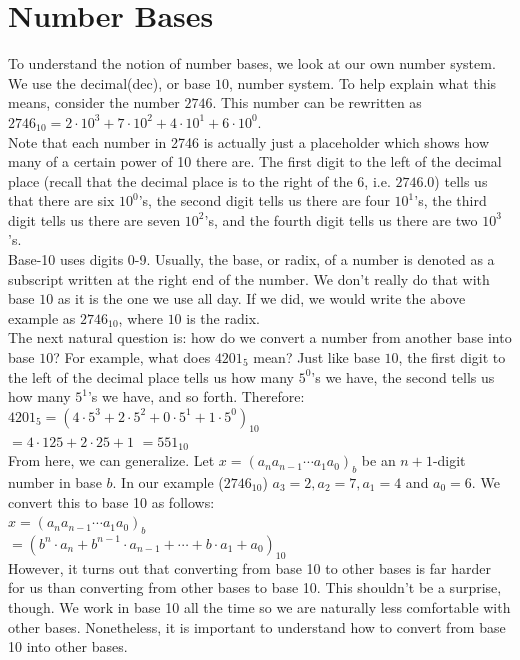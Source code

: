 \section{Number Bases}
To understand the notion of number bases, we look at our own number system. We use the decimal(dec), or base $10$, number system. To help explain what this means, consider the number $2746$. This number can be rewritten as $2746_{10}=2\cdot10^3+7\cdot10^2+4\cdot10^1+6\cdot10^0.$\\
Note that each number in 2746 is actually just a placeholder which shows how many of a certain power of 10 there are. The first digit to the left of the decimal place (recall that the decimal place is to the right of the $6$, i.e. $2746.0$) tells us that there are six $10^0$'s, the second digit tells us there are four $10^1$'s, the third digit tells us there are seven $10^2$'s, and the fourth digit tells us there are two $10^3$'s.\\
Base-10 uses digits 0-9. Usually, the base, or radix, of a number is denoted as a subscript written at the right end of the number. We don't really do that with base $10$ as it is the one we use all day. If we did, we would write the above example as $2746_{10}$, where $10$ is the radix.\\
The next natural question is: how do we convert a number from another base into base $10$? For example, what does $4201_5$ mean? Just like base $10$, the first digit to the left of the decimal place tells us how many $5^0$'s we have, the second tells us how many $5^1$'s we have, and so forth. Therefore:\\
$4201_5 = (4\cdot 5^3 + 2\cdot 5^2 + 0\cdot 5^1 + 1\cdot 5^0)_{10}$\\
$=4\cdot 125 + 2\cdot 25 + 1$
$= 551_{10}$\\
From here, we can generalize. Let $x=(a_na_{n-1}\cdots a_1a_0)_b$ be an $n+1$-digit number in base $b$. In our example ($2746_{10}$) $a_3 = 2, a_2 = 7, a_1 = 4$ and $a_0 = 6$. We convert this to base 10 as follows:\\
$x = (a_na_{n-1}\cdots a_1a_0)_b$\\
$= (b^n\cdot a_n + b^{n-1}\cdot a_{n-1}+\cdots + b\cdot a_1 + a_0)_{10}$\\
However, it turns out that converting from base 10 to other bases is far harder for us than converting from other bases to base 10. This shouldn't be a surprise, though. We work in base 10 all the time so we are naturally less comfortable with other bases. Nonetheless, it is important to understand how to convert from base 10 into other bases.\\
